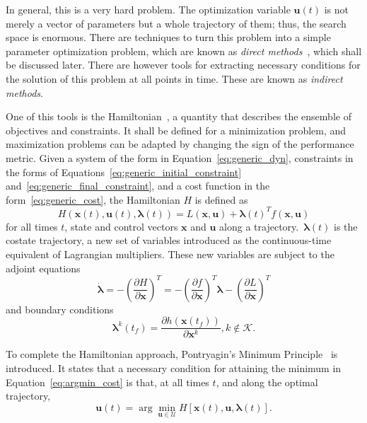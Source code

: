 In general, this is a very hard problem. The optimization variable \(\mathbf{u}(t)\) is not merely a vector of parameters but a whole trajectory of them; thus, the search space is enormous. There are techniques to turn this problem into a simple parameter optimization problem, which are known as \textit{direct methods}~\cite{Conway_2010}, which shall be discussed later. There are however tools for extracting necessary conditions for the solution of this problem at all points in time. These are known as \textit{indirect methods}.

One of this tools is the Hamiltonian~\cite{Conway_2010}, a quantity that describes the ensemble of objectives and constraints. It shall be defined for a minimization problem, and maximization problems can be adapted by changing the sign of the performance metric. Given a system of the form in Equation~\eqref{eq:generic_dyn}, constraints in the forms of Equations~\eqref{eq:generic_initial_constraint} and~\eqref{eq:generic_final_constraint}, and a cost function in the form~\eqref{eq:generic_cost}, the Hamiltonian \(H\) is defined as~\cite{bertsekas}
\begin{equation}
    H(\mathbf{x}(t), \mathbf{u}(t), \mathbf{\lambda}(t)) = L(\mathbf{x}, \mathbf{u}) + \mathbf{\lambda}{(t)}^T f(\mathbf{x}, \mathbf{u})
\end{equation}
for all times \(t\), state and control vectors \(\mathbf{x}  \) and \(\mathbf{u}\) along a trajectory.\ \( \mathbf{\lambda}(t) \) is the costate trajectory, a new set of variables introduced as the continuous-time equivalent of Lagrangian multipliers. These new variables are subject to the adjoint equations
\begin{equation}
    \dot{\mathbf{\lambda}} = - \left( \frac{\partial H}{\partial \mathbf{x}} \right)^T = -\left( \frac{\partial f}{\partial \mathbf{x}} \right)^T \mathbf{\lambda} - \left( \frac{\partial L}{\partial \mathbf{x}} \right)^T
\end{equation}
and boundary conditions~\cite{bryson_applied_optimal_control}
\begin{equation}\label{eq:final_costate}
    \mathbf{\lambda}^k(t_f) = \frac{\partial h(\mathbf{x}(t_f))}{\partial \mathbf{x}^k}, k \notin \mathcal{K}.
\end{equation}

To complete the Hamiltonian approach, Pontryagin's Minimum Principle~\cite{bertsekas} is introduced. It states that a necessary condition for attaining the minimum in Equation~\eqref{eq:argmin_cost} is that, at all times \(t\), and along the optimal trajectory,
\begin{equation} \label{eq:Pontryagin}
    \mathbf{u}(t) = \arg \min_{\mathbf{u} \in \mathcal{U}} H[\mathbf{x}(t), \mathbf{u}, \mathbf{\lambda}(t)].
\end{equation}

